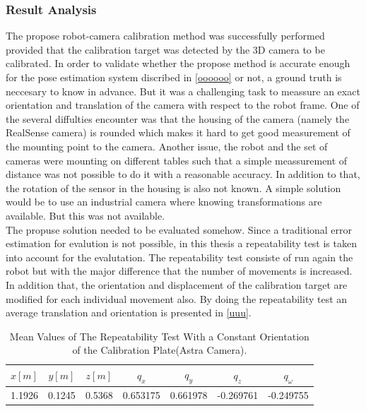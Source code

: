 \subsubsection{Result Analysis}

The propose robot-camera calibration method was successfully performed provided that the calibration target was detected by the 3D camera to be calibrated. In order to validate whether the propose method is accurate enough for the pose estimation system discribed in \ref{oooooo} or not, a ground truth is neccesary to know in advance. But it was a challenging task to meassure an exact orientation and translation of the camera with respect to the robot frame. One of the several diffulties encounter was that the housing of the camera (namely the RealSense camera) is rounded which makes it hard to get good measurement of the mounting point to the camera. Another issue, the robot and the set of cameras were mounting on different tables such that a simple meassurement of distance was not possible to do it with a reasonable accuracy. In addition to that, the rotation of the sensor in the housing is also not known. A simple solution would be to use an industrial camera where knowing transformations are available. But this was not available. \\
The propuse solution needed to be evaluated somehow. Since a traditional error estimation for evalution is not possible, in this thesis a repeatability test is taken into account for the evalutation. The repeatability test consiste of run again the robot but with the major difference that the number of movements is increased. In addition that, the orientation and displacement of the calibration target are modified for each individual movement also. By doing the repeatability test an average translation and orientation is presented in \ref{uuu}.













\begin{table}[b]
\renewcommand{\arraystretch}{1.3}
\caption{Mean Values of The Repeatability Test With a Constant Orientation of the Calibration Plate(Astra Camera).}
\label{meanastra1}
\centering
\begin{tabular}{|c||c||c||c||c||c||c|}
\hline
$x[m]$ & $y[m]$ & $z[m]$ & $q_{x}$ & $q_{y}$ & $q_{z}$ &$q_{\omega}$ \\
\hline
1.1926 & 0.1245 & 0.5368& 0.653175&	0.661978&	-0.269761&	-0.249755 \\
\hline
\hline
\end{tabular}
\end{table}

